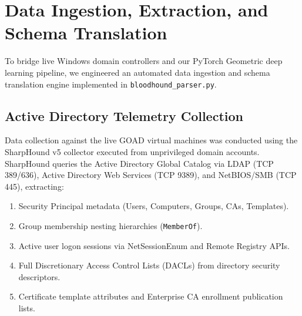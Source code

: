 \section{Data Ingestion, Extraction, and Schema Translation}
To bridge live Windows domain controllers and our PyTorch Geometric deep learning pipeline, we engineered an automated data ingestion and schema translation engine implemented in \texttt{bloodhound\_parser.py}.

\subsection{Active Directory Telemetry Collection}
Data collection against the live GOAD virtual machines was conducted using the SharpHound v5 collector executed from unprivileged domain accounts. SharpHound queries the Active Directory Global Catalog via LDAP (TCP 389/636), Active Directory Web Services (TCP 9389), and NetBIOS/SMB (TCP 445), extracting:
\begin{enumerate}
    \item Security Principal metadata (Users, Computers, Groups, CAs, Templates).
    \item Group membership nesting hierarchies (\texttt{MemberOf}).
    \item Active user logon sessions via NetSessionEnum and Remote Registry APIs.
    \item Full Discretionary Access Control Lists (DACLs) from directory security descriptors.
    \item Certificate template attributes and Enterprise CA enrollment publication lists.
\end{enumerate}


